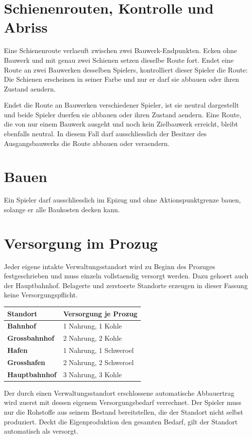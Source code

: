 \documentclass[11pt,a4paper,oneside,parskip=half]{scrreprt}
\begin{document}
\section{Schienenrouten, Kontrolle und Abriss}
Eine Schienenroute verlaeuft zwischen zwei Bauwerk-Endpunkten. Ecken ohne
Bauwerk und mit genau zwei Schienen setzen dieselbe Route fort. Endet eine Route an zwei
Bauwerken desselben Spielers, kontrolliert dieser Spieler die Route: Die Schienen
erscheinen in seiner Farbe und nur er darf sie abbauen oder ihren Zustand
aendern.

Endet die Route an Bauwerken verschiedener Spieler, ist sie neutral dargestellt
und beide Spieler duerfen sie abbauen oder ihren Zustand aendern. Eine Route, die
von nur einem Bauwerk ausgeht und noch kein Zielbauwerk erreicht, bleibt ebenfalls
neutral. In diesem Fall darf ausschliesslich der Besitzer des Ausgangsbauwerks
die Route abbauen oder veraendern.

\section{Bauen}
Ein Spieler darf ausschliesslich im Epizug und ohne Aktionspunktgrenze bauen, solange er alle Baukosten decken kann.

\section{Versorgung im Prozug}
Jeder eigene intakte Verwaltungsstandort wird zu Beginn des Prozuges festgeschrieben und muss einzeln vollstaendig versorgt werden. Dazu gehoert auch der Hauptbahnhof. Belagerte und zerstoerte Standorte erzeugen in dieser Fassung keine Versorgungspflicht.

\begin{center}
\begin{tabular}{>{\bfseries}l l}
\toprule
Standort & Versorgung je Prozug \\
\midrule
Bahnhof & 1 Nahrung, 1 Kohle \\
Grossbahnhof & 2 Nahrung, 2 Kohle \\
Hafen & 1 Nahrung, 1 Schweroel \\
Grosshafen & 2 Nahrung, 2 Schweroel \\
Hauptbahnhof & 3 Nahrung, 3 Kohle \\
\bottomrule
\end{tabular}
\end{center}

Der durch einen Verwaltungsstandort erschlossene automatische Abbauertrag wird
zuerst mit dessen eigenem Versorgungsbedarf verrechnet. Der Spieler muss nur die
Rohstoffe aus seinem Bestand bereitstellen, die der Standort nicht selbst
produziert. Deckt die Eigenproduktion den gesamten Bedarf, gilt der Standort
automatisch als versorgt.
\end{document}

